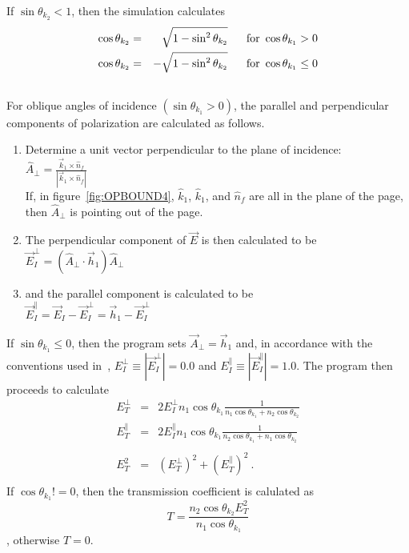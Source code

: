 If $\sin\theta_{k_2} < 1$, then the simulation calculates
\begin{eqnarray}
  \cos\theta_{k_2} &=&  \sqrt{1-\sin^2\theta_{k_2}} ~~~~~{\rm for}~\cos\theta_{k_1} > 0 \nonumber \\
  \cos\theta_{k_2} &=& -\sqrt{1-\sin^2\theta_{k_2}} ~~~~~{\rm for}~\cos\theta_{k_1} \leq 0 \nonumber \\ \nonumber
\end{eqnarray}
For oblique angles of incidence $(\sin\theta_{k_1} > 0)$, the parallel and
perpendicular components of polarization are calculated as follows.
\begin{enumerate}
  \item{Determine a unit vector perpendicular to the plane of incidence: \\
        $\hat{A}_{\perp} = \frac{\vec{k}_1\times\hat{n}_f}{|\vec{k}_1\times\hat{n}_f|}$\\
        If, in figure~\ref{fig:OPBOUND4}, $\hat{k}_1$, $\hat{k}_1$, and $\hat{n}_f$
        are all in the plane of the page, then $\hat{A}_{\perp}$ is pointing out of
        the page.}
  \item{The perpendicular component of $\vec{E}$ is then calculated to be\\
        $\vec{E}^{\perp}_I = \left(\hat{A}_{\perp}\cdot\vec{h}_1\right)\hat{A}_{\perp}$}
  \item{and the parallel component is calculated to be \\
        $\vec{E}^{\parallel}_I = \vec{E}_I - \vec{E}^{\perp}_I = \vec{h}_1 - \vec{E}^{\perp}_I$}
\end{enumerate}

If $\sin\theta_{k_1} \leq 0$, then the program sets $\vec{A}_{\perp} = \vec{h}_1$
and, in accordance with the conventions used in~\cite{bb:JACKSON}, 
$E^{\perp}_I \equiv |\vec{E}^{\perp}_I| = 0.0$ and $E^{\parallel}_I \equiv |\vec{E}^{\parallel}_I| = 1.0$. The program
then proceeds to calculate~\cite{bb:HECHT}
\begin{eqnarray}
  E^{\perp}_T     &=& 2E^{\perp}_I n_1     \cos\theta_{k_1}\frac{1}{n_1 \cos\theta_{k_1} + n_2 \cos\theta_{k_2}} \nonumber \\
  E^{\parallel}_T &=& 2E^{\parallel}_I n_1 \cos\theta_{k_1}\frac{1}{n_2 \cos\theta_{k_1} + n_1 \cos\theta_{k_2}} \nonumber \\ 
                  & & \nonumber \\
  E^2_T           &=& (E^{\perp}_T)^2 + (E^{\parallel}_T)^2~. \nonumber \\ \nonumber 
\end{eqnarray}
If $\cos\theta_{k_1} != 0$, then the transmission coefficient is calulated as
$$T = \frac{n_2\cos\theta_{k_2}E^2_T}{n_1\cos\theta_{k_1}}$$, otherwise $T = 0$.

